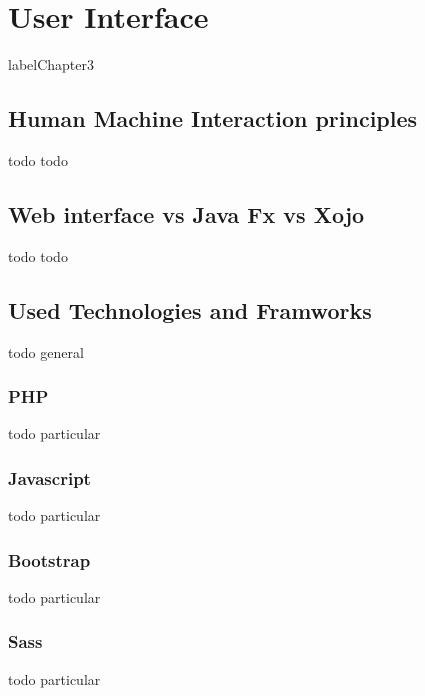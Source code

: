 

\chapter{User Interface } %

label{Chapter3} %




\section{Human Machine Interaction principles}
todo todo

\section{Web interface vs Java Fx vs Xojo}
todo todo

\section{Used Technologies and Framworks}
todo general

\subsection{PHP}
todo particular

\subsection{Javascript}
todo particular

\subsection{Bootstrap}
todo particular

\subsection{Sass}
todo particular
